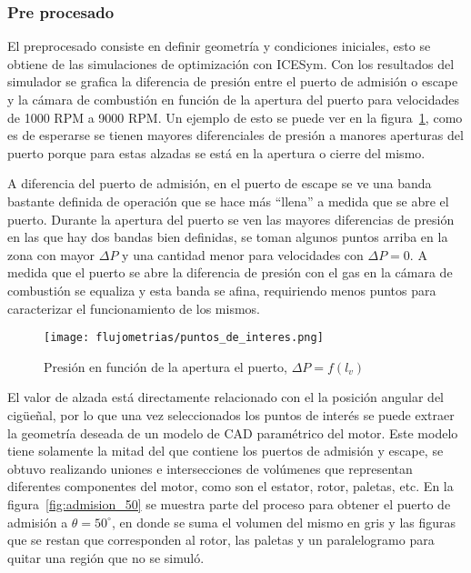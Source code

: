 
\subsubsection{Pre procesado}
%
El preprocesado consiste en definir geometría y condiciones iniciales, esto se
obtiene de las simulaciones de optimización con ICESym.
%
Con los resultados del simulador se grafica la diferencia de presión entre
el puerto de admisión o escape y la cámara de combustión en función de
la apertura del puerto para velocidades de 1000 RPM a 9000 RPM.
%
Un ejemplo de esto se puede ver en la figura~\ref{fig:puntos_interes}, como
es de esperarse se tienen mayores diferenciales de presión a manores aperturas
del puerto porque para estas alzadas se está en la apertura o cierre del mismo.

A diferencia del puerto de admisión, en el puerto de escape se ve una banda
bastante definida de operación que se hace más ``llena'' a medida que se abre el
puerto.
%
Durante la apertura del puerto se ven las mayores diferencias de presión en las
que hay dos bandas bien definidas, se toman algunos puntos arriba en la zona con
mayor $\Delta P$ y una cantidad menor para velocidades con $\Delta P = 0$.
%
A medida que el puerto se abre la diferencia de presión con el gas en la cámara
de combustión se equaliza y esta banda se afina, requiriendo menos puntos para
caracterizar el funcionamiento de los mismos.

\begin{figure}
    \centering
    \texttt{[image: flujometrias/puntos\_de\_interes.png]}
    \caption{Presión en función de la apertura el puerto,
$\Delta P = f(l_{v})$}\label{fig:puntos_interes}
\end{figure}

%
El valor de alzada está directamente relacionado con el la posición angular del
cigüeñal, por lo que una vez seleccionados los puntos de interés se puede
extraer la geometría deseada de un modelo de CAD paramétrico del motor.
%
Este modelo tiene solamente la mitad del que contiene los puertos de admisión y
escape, se obtuvo realizando uniones e intersecciones de volúmenes que
representan diferentes componentes del motor, como son el estator, rotor,
paletas, etc.
%
En la figura~\ref{fig:admision_50} se muestra parte del proceso para obtener el
puerto de admisión a $\theta=50^{\circ}$, en donde se suma el volumen del mismo
en gris y las figuras que se restan que corresponden al rotor, las paletas y un
paralelogramo para quitar una región que no se simuló.

